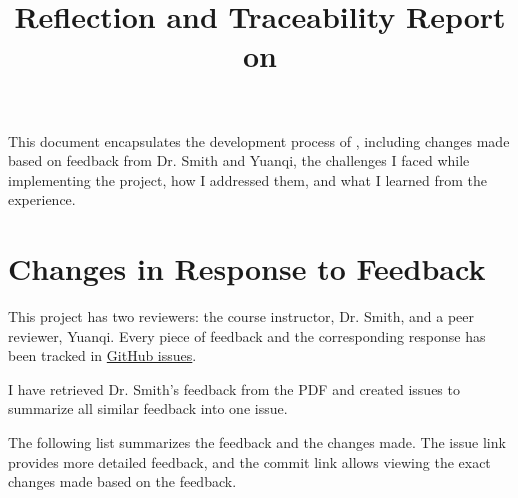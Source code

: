 \documentclass{article}
\title{Reflection and Traceability Report on \progname}
\author{\authname}
\date{}
\begin{document}
\maketitle


This document encapsulates the development process of \progname, including changes made based on feedback from Dr. Smith and Yuanqi, the challenges I faced while implementing the project, how I addressed them, and what I learned from the experience.
\section{Changes in Response to Feedback}

This project has two reviewers: the course instructor, Dr. Smith, and a peer reviewer, Yuanqi. Every piece of feedback and the corresponding response has been tracked in \href{https://github.com/V-AS/Two-tower-recommender-system/issues}{GitHub issues}. 

I have retrieved Dr. Smith's feedback from the PDF and created issues to summarize all similar feedback into one issue.

The following list summarizes the feedback and the changes made. The issue link provides more detailed feedback, and the commit link allows viewing the exact changes made based on the feedback.
\end{document}
